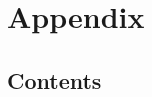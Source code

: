 \section*{\LARGE Appendix}
\label{appendix}

\subsection*{Contents}

\newcommand{\appcontentssection}[3]{%
  \noindent\makebox[\linewidth]{\textbf{#1\quad #2}\hfill\textbf{\pageref{#3}}}\par\vspace{0.06em}}
\newcommand{\appcontentsitem}[3]{%
  \noindent\hspace*{2.1em}\makebox[\dimexpr\linewidth-2.1em\relax]{#1\quad #2\leaders\hbox to 0.55em{\hss.\hss}\hfill\pageref{#3}}\par\vspace{0em}}

